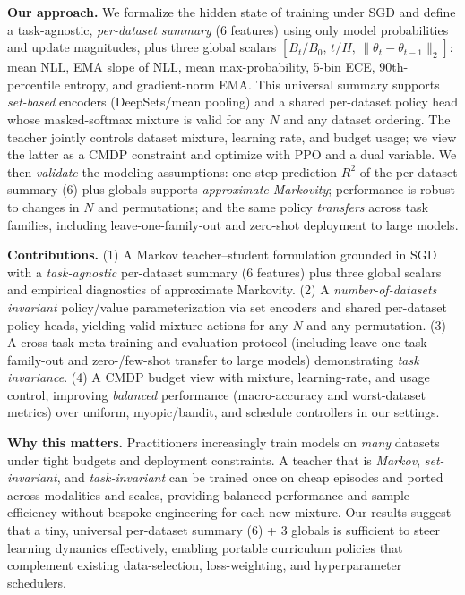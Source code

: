 \documentclass[11pt]{article}
\newcommand{\1}{\mathbf{1}}
\begin{document}
\textbf{Our approach.} We formalize the hidden state of training under SGD and define a task-agnostic, \emph{per-dataset summary} (6 features) using only model probabilities and update magnitudes, plus three global scalars \([B_t/B_0,\,t/H,\,\|\theta_t-\theta_{t-1}\|_2]\): mean NLL, EMA slope of NLL, mean max-probability, 5-bin ECE, 90th-percentile entropy, and gradient-norm EMA. This universal summary supports \emph{set-based} encoders (DeepSets/mean pooling) and a shared per-dataset policy head whose masked-softmax mixture is valid for any $N$ and any dataset ordering. The teacher jointly controls dataset mixture, learning rate, and budget usage; we view the latter as a CMDP constraint and optimize with PPO and a dual variable. We then \emph{validate} the modeling assumptions: one-step prediction $R^2$ of the per-dataset summary (6) plus globals supports \emph{approximate Markovity}; performance is robust to changes in $N$ and permutations; and the same policy \emph{transfers} across task families, including leave-one-family-out and zero-shot deployment to large models.

\textbf{Contributions.} (1) A Markov teacher--student formulation grounded in SGD with a \emph{task-agnostic} per-dataset summary (6 features) plus three global scalars and empirical diagnostics of approximate Markovity. (2) A \emph{number-of-datasets invariant} policy/value parameterization via set encoders and shared per-dataset policy heads, yielding valid mixture actions for any $N$ and any permutation. (3) A cross-task meta-training and evaluation protocol (including leave-one-task-family-out and zero-/few-shot transfer to large models) demonstrating \emph{task invariance}. (4) A CMDP budget view with mixture, learning-rate, and usage control, improving \emph{balanced} performance (macro-accuracy and worst-dataset metrics) over uniform, myopic/bandit, and schedule controllers in our settings.

\textbf{Why this matters.} Practitioners increasingly train models on \emph{many} datasets under tight budgets and deployment constraints. A teacher that is \emph{Markov}, \emph{set-invariant}, and \emph{task-invariant} can be trained once on cheap episodes and ported across modalities and scales, providing balanced performance and sample efficiency without bespoke engineering for each new mixture. Our results suggest that a tiny, universal per-dataset summary (6) + 3 globals is sufficient to steer learning dynamics effectively, enabling portable curriculum policies that complement existing data-selection, loss-weighting, and hyperparameter schedulers.
\end{document}
